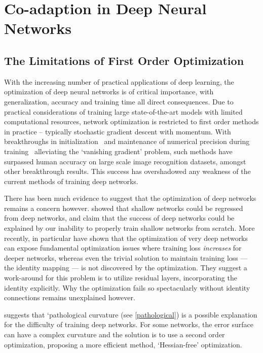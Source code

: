 \documentclass[thesis]{subfiles}
\begin{document}
    \chapter{Co-adaption in Deep Neural Networks}\label{pairablation}
\section{The Limitations of First Order Optimization}
With the increasing number of practical applications of deep learning, the optimization of deep neural networks is of critical importance, with generalization, accuracy and training time all direct consequences. Due to practical considerations of training large state-of-the-art models with limited computational resources, network optimization is restricted to first order methods in practice -- typically stochastic gradient descent with momentum. With breakthroughs in initialization~\citep{glorot2010understanding,He2015b} and maintenance of numerical precision during training~\citep{Ioffe2015} alleviating the `vanishing gradient' problem, such methods have surpassed human accuracy on large scale image recognition datasets, amongst other breakthrough results. This success has overshadowed any weakness of the current methods of training deep networks.

There has been much evidence to suggest that the optimization of deep networks remains a concern however. \citet{Ba2013dothey} showed that shallow networks could be regressed from deep networks, and claim that the success of deep networks could be explained by our inability to properly train shallow networks from scratch. More recently, \citet{He2015,He2016} in particular have shown that the optimization of very deep networks can expose fundamental optimization issues where training loss \emph{increases} for deeper networks, whereas even the trivial solution to maintain training loss --- the identity mapping --- is not discovered by the optimization. They suggest a work-around for this problem is to utilize residual layers, incorporating the identity explicitly. Why the optimization fails so spectacularly without identity connections remains unexplained however.

\citet{martens2010deep} suggests that `pathological curvature (see \cref{pathological}) is a possible explanation for the difficulty of training deep networks. For some networks, the error surface can have a complex curvature  and the solution is to use a second order optimization, proposing a more efficient method, `Hessian-free' optimization.
\end{document}
